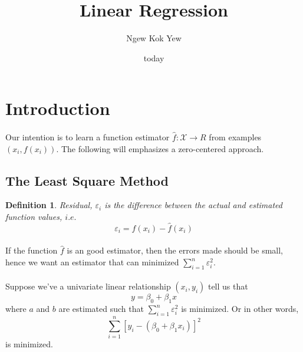 \documentclass{article}
\title{Linear Regression}
\author{Ngew Kok Yew}
\date{today}
\newtheorem{definition}{Definition}
\begin{document}
\maketitle
{}
\newpage
{}

\section{Introduction}
\paragraph{}
Our intention is to learn a function estimator $\hat{f}:\mathcal{X}\to R$ from examples $(x_i,f(x_i))$. The following will emphasizes a zero-centered approach.

\subsection{The Least Square Method}
\begin{definition}
Residual, $\varepsilon_i$ is the difference between the actual and estimated function values, $i.e.$
\begin{equation}
\varepsilon_i = f(x_i) - \hat{f}(x_i)
\end{equation}
\end{definition}
\paragraph{}
If the function $\hat{f}$ is an good estimator, then the errors made should be small, hence we want an estimator that can minimized $\displaystyle\sum_{i=1}^{n} \varepsilon_i^2$.
\paragraph{}
Suppose we've a univariate linear relationship $(x_i, y_i)$ tell us that 
\begin{equation*}
y = \beta_0 + \beta_1 x
\end{equation*}
where $a$ and $b$ are estimated such that $\displaystyle\sum_{i=1}^{n} \varepsilon_i^2$ is minimized. Or in other words,
\begin{equation}
\displaystyle\sum_{i=1}^{n} [y_i - (\beta_0 + \beta_1 x_i)]^2
\end{equation}
is minimized.
\end{document}

